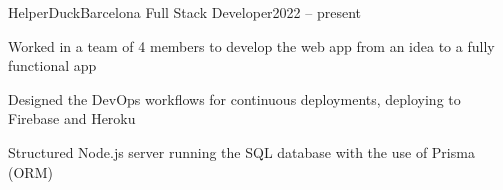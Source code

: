 \resumeSubheading
  {HelperDuck}{Barcelona}
  {Full Stack Developer}{2022 – present}
  \vspace{-2.0mm}
  \resumeItemListStart
\item Worked in a team of 4 members to develop the web app from an idea to a fully functional app
\item Designed the DevOps workflows for continuous deployments, deploying to Firebase and Heroku
\item Structured Node.js server running the SQL database with the use of Prisma (ORM)
  \resumeItemListEnd 